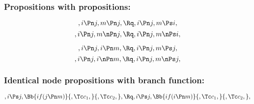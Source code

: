 \bigskip
\bigskip
\bigskip
\bigskip
\subsubsection{Propositions with propositions:}
\[,i \Pn j, m \Pn j, \Rq , i \Pn j, m \Ps i,\]
\[,i \Pn j, m \nPn j, \Rq , i \Pn j, m \nPs i,\]

\[,i \Pn j, i \Pn m, \Rq , i \Pn j, m \Ps j,\]
\[,i \Pn j, i \nPn m, \Rq , i \Pn j, m \nPs j,\]

\bigskip
\bigskip
\bigskip
\bigskip
\subsubsection{Identical node propositions with  branch function:}
\[,i \Ps j, \Bb{if(j \Pn m)}{,\Tc c_1,}{,\Tc c_2,}, \Rq ,i \Ps j, \Bb{if(i \Pn m)}{,\Tc c_1,}{,\Tc c_2,}, \]

